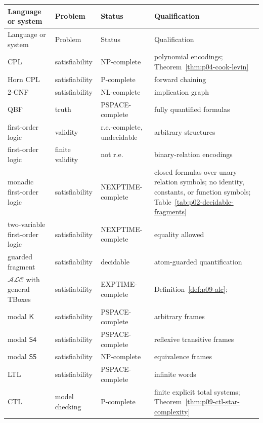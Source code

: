 \begin{longtable}{@{}p{}p{}p{}p{}@{}}
\toprule
Language or system & Problem & Status & Qualification \\
\midrule
\endfirsthead
\toprule
Language or system & Problem & Status & Qualification \\
\midrule
\endhead
CPL & satisfiability & NP-complete & polynomial encodings;
Theorem~\ref{thm:p04-cook-levin} \\
Horn CPL & satisfiability & P-complete & forward chaining \cite{DowlingGallier1984} \\
2-CNF & satisfiability & NL-complete & implication graph \cite{AspvallPlassTarjan1979} \\
QBF & truth & PSPACE-complete & fully quantified formulas \cite{Stockmeyer1976} \\
first-order logic & validity & r.e.-complete, undecidable & arbitrary structures \cite{Church1936,Turing1937} \\
first-order logic & finite validity & not r.e. & binary-relation encodings \cite{Trakhtenbrot1950} \\
monadic first-order logic & satisfiability & NEXPTIME-complete & closed formulas
over unary relation symbols; no identity, constants, or function symbols;
Table~\ref{tab:p02-decidable-fragments} \cite{Lewis1980} \\
two-variable first-order logic & satisfiability & NEXPTIME-complete & equality allowed \cite{GradelKolaitisVardi1997} \\
guarded fragment & satisfiability & decidable & atom-guarded quantification \cite{Gradel1999} \\
\(\mathcal{ALC}\) with general TBoxes & satisfiability & EXPTIME-complete & Definition~\ref{def:p09-alc}; \cite{BaaderHorrocksLutzSattler2017} \\
modal \(\mathsf K\) & satisfiability & PSPACE-complete & arbitrary frames \cite{Ladner1977} \\
modal \(\mathsf{S4}\) & satisfiability & PSPACE-complete & reflexive transitive frames \cite{Ladner1977} \\
modal \(\mathsf{S5}\) & satisfiability & NP-complete & equivalence frames \cite{Ladner1977} \\
LTL & satisfiability & PSPACE-complete & infinite words \cite{SistlaClarke1985} \\
CTL & model checking & P-complete & finite explicit total systems;
Theorem~\ref{thm:p09-ctl-star-complexity} \\

\end{longtable}

